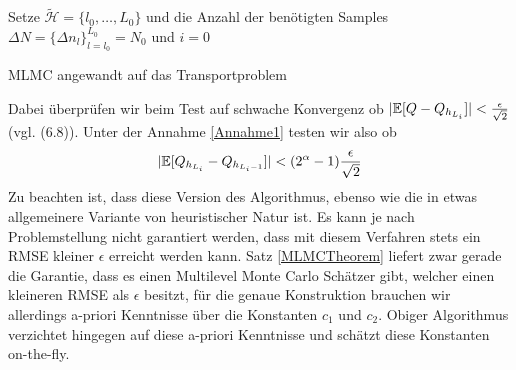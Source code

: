  \begin{algorithm}[H]
 	\DontPrintSemicolon
 	\SetAlgoLined
 	\BlankLine
 	
 	Setze $ \tilde{\mathcal{H}} = \{ l_0,\dots,L_0 \} $ und die Anzahl der benötigten Samples $ \Delta N = \{ \Delta n_l \}_{l=l_0}^{L_0} = N_0$ und $ i = 0 $\;
 	\BlankLine
 	\caption{MLMC angewandt auf das Transportproblem}
 \end{algorithm}
\bigskip %
Dabei überprüfen wir beim Test auf schwache Konvergenz ob $ | \mathbb{E}[Q-Q_{h_{L_i}}] | < \frac{\epsilon}{\sqrt{2}}$ (vgl. (6.8)).
Unter der Annahme \ref{Annahme1} testen wir also ob
\[
	| \mathbb{E}[Q_{h_{L_{i}}}-Q_{h_{L_{i}-1}}] | < (2^{\alpha}-1)\frac{\epsilon}{\sqrt{2}}
\]
Zu beachten ist, dass diese Version des Algorithmus, ebenso wie die in \cite{giles_2015} etwas allgemeinere Variante von heuristischer Natur ist. Es kann je nach Problemstellung nicht garantiert werden, dass mit diesem Verfahren stets ein RMSE kleiner $ \epsilon $ erreicht werden kann.
Satz \ref{MLMCTheorem} liefert zwar gerade die Garantie, dass es einen Multilevel Monte Carlo Schätzer gibt, welcher einen kleineren RMSE als $ \epsilon $ besitzt, für die genaue Konstruktion brauchen wir allerdings a-priori Kenntnisse über die Konstanten $ c_1 $ und $ c_2 $. Obiger Algorithmus verzichtet hingegen auf diese a-priori Kenntnisse und schätzt diese Konstanten on-the-fly.
